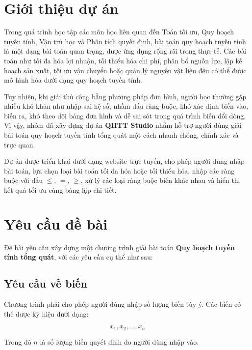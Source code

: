 \documentclass[14pt, a4paper]{extarticle}
\begin{document}
    \endgroup
    
    
    \section{Giới thiệu dự án}
    
    Trong quá trình học tập các môn học liên quan đến Toán tối ưu, Quy hoạch tuyến tính, Vận trù học và Phân tích quyết định, bài toán quy hoạch tuyến tính là một dạng bài toán quan trọng, được ứng dụng rộng rãi trong thực tế. Các bài toán như tối đa hóa lợi nhuận, tối thiểu hóa chi phí, phân bổ nguồn lực, lập kế hoạch sản xuất, tối ưu vận chuyển hoặc quản lý nguyên vật liệu đều có thể được mô hình hóa dưới dạng quy hoạch tuyến tính.
    
    Tuy nhiên, khi giải thủ công bằng phương pháp đơn hình, người học thường gặp nhiều khó khăn như nhập sai hệ số, nhầm dấu ràng buộc, khó xác định biến vào, biến ra, khó theo dõi bảng đơn hình và dễ sai sót trong quá trình biến đổi dòng. Vì vậy, nhóm đã xây dựng dự án \textbf{QHTT Studio} nhằm hỗ trợ người dùng giải bài toán quy hoạch tuyến tính tổng quát một cách nhanh chóng, chính xác và trực quan.
    
    Dự án được triển khai dưới dạng website trực tuyến, cho phép người dùng nhập bài toán, lựa chọn loại bài toán tối đa hóa hoặc tối thiểu hóa, nhập các ràng buộc với dấu $\leq$, $=$, $\geq$, xử lý các loại ràng buộc biến khác nhau và hiển thị kết quả tối ưu cùng bảng lặp chi tiết.
    
    \section{Yêu cầu đề bài}
    
    Đề bài yêu cầu xây dựng một chương trình giải bài toán \textbf{Quy hoạch tuyến tính tổng quát}, với các yêu cầu cụ thể như sau:
    
    \subsection{Yêu cầu về biến}
    
    Chương trình phải cho phép người dùng nhập số lượng biến tùy ý. Các biến có thể được ký hiệu dưới dạng:
    
    \[
    x_1, x_2, \ldots, x_n
    \]
    
    Trong đó $n$ là số lượng biến quyết định do người dùng nhập vào.
    
\end{document}
